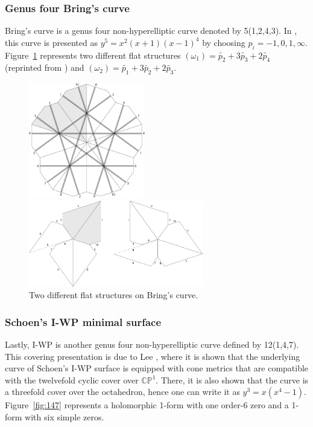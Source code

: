 \documentclass[12pt,reqno]{amsart}
\newcommand{\C}{\mathbb{C}}
\renewcommand{\P}{\mathbb{P}}
\theoremstyle{definition}
\theoremstyle{remark}
\begin{document}
\subsubsection{Genus four Bring's curve}
Bring's curve is a genus four non-hyperelliptic curve denoted by 5(1,2,4,3). In \cite{matti}, this curve is presented as $y^5 = x^2(x+1)(x-1)^4$ by choosing $p_i = -1, 0, 1, \infty.$ Figure~\ref{fig:1243} represents two different flat structures $(\omega_1) = \widetilde{p_2} + 3 \widetilde{p_3} + 2 \widetilde{p_4}$ (reprinted from \cite{matti}) and $(\omega_2) = \widetilde{p_1} + 3 \widetilde{p_2} + 2 \widetilde{p_3}.$

\begin{figure}[htbp] %
\centering
\begin{minipage}{0.5\textwidth}
  \centering
  \includegraphics[width=2in]{figures/1243_flat.pdf}
\end{minipage}%
\begin{minipage}{0.5\textwidth}
  \centering
  \includegraphics[width=3in]{figures/1243_flat_2.pdf}
\end{minipage}
  \caption{Two different flat structures on Bring's curve.}
  \label{fig:1243}
\end{figure}

\subsubsection{Schoen's I-WP minimal surface}
Lastly, I-WP is another genus four non-hyperelliptic curve defined by 12(1,4,7). This covering presentation is due to Lee \cite{dthesis}, where it is shown that the underlying curve of Schoen's I-WP surface is equipped with cone metrics that are compatible with the twelvefold cyclic cover over $\C\P^1.$ There, it is also shown that the curve is a threefold cover over the octahedron, hence one can write it as $y^3 = x (x^4 -1).$ Figure~\ref{fig:147} represents a holomorphic 1-form with one order-6 zero and a 1-form with six simple zeros.
\end{document}
